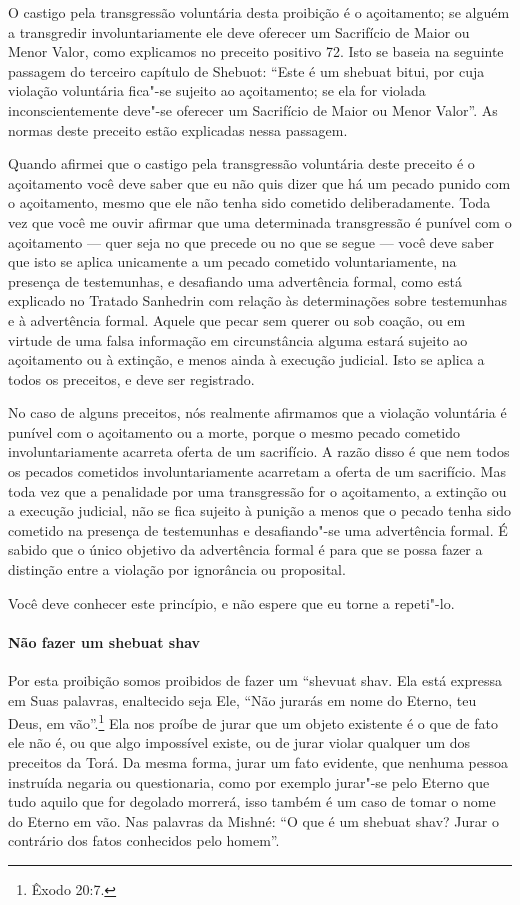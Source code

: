 \begin{multicols}{2}
O castigo pela transgressão voluntária desta proibição é o açoitamento; se alguém a transgredir involuntariamente ele deve oferecer um
Sacrifício de Maior ou Menor Valor, como explicamos no preceito
positivo 72. Isto se baseia na seguinte passagem do terceiro capítulo de
Shebuot\starr: ``Este é um shebuat bitui\starr, por cuja violação voluntária
fica"-se sujeito ao açoitamento; se ela for violada inconscientemente
deve"-se oferecer um Sacrifício de Maior ou Menor Valor''. As normas
deste preceito estão explicadas nessa passagem.

Quando afirmei que o castigo pela transgressão voluntária deste preceito
é o açoitamento você deve saber que eu não quis dizer que há um pecado
punido com o açoitamento, mesmo que ele não tenha sido cometido
deliberadamente. Toda vez que você me ouvir afirmar que uma determinada
transgressão é punível com o açoitamento --- quer seja no que precede
ou no que se segue --- você deve saber que isto se aplica unicamente a
um pecado cometido voluntariamente, na presença de testemunhas, e
desafiando uma advertência formal, como está explicado no Tratado
Sanhedrin\starr{} com relação às determinações sobre testemunhas e à
advertência formal. Aquele que pecar sem querer ou sob coação, ou em
virtude de uma falsa informação em circunstância alguma estará sujeito
ao açoitamento ou à extinção, e menos ainda à execução judicial. Isto
se aplica a todos os preceitos, e deve ser registrado.

No caso de alguns preceitos, nós realmente afirmamos que a violação
voluntária é punível com o açoitamento ou a morte, porque o mesmo
pecado cometido involuntariamente acarreta oferta de um sacrifício. A
razão disso é que nem todos os pecados cometidos involuntariamente
acarretam a oferta de um sacrifício. Mas toda vez que a penalidade por
uma transgressão for o açoitamento, a extinção ou a execução judicial,
não se fica sujeito à punição a menos que o pecado tenha sido cometido
na presença de testemunhas e desafiando"-se uma advertência formal. É
sabido que o único objetivo da advertência formal é para que se possa
fazer a distinção entre a violação por ignorância ou proposital.

Você deve conhecer este princípio, e não espere que eu torne a repeti"-lo.

\paragraph{Não fazer um shebuat shav\starr}

Por esta proibição somos proibidos de fazer um ``shevuat shav\starr.
Ela está expressa em Suas palavras, enaltecido seja
Ele, ``Não jurarás em nome do Eterno, teu Deus, em vão''.\footnote{Êxodo 20:7.}
Ela nos proíbe de jurar que um objeto existente é o que de fato ele não
é, ou que algo impossível existe, ou de jurar violar qualquer um dos
preceitos da Torá\starr. Da mesma forma, jurar um fato evidente, que nenhuma
pessoa instruída negaria ou questionaria, como por exemplo jurar"-se
pelo Eterno que tudo aquilo que for degolado morrerá, isso também é um
caso de tomar o nome do Eterno em vão. Nas palavras da Mishné: ``O que é
um shebuat shav\starr? Jurar o contrário dos fatos conhecidos pelo homem''.


\end{multicols}
